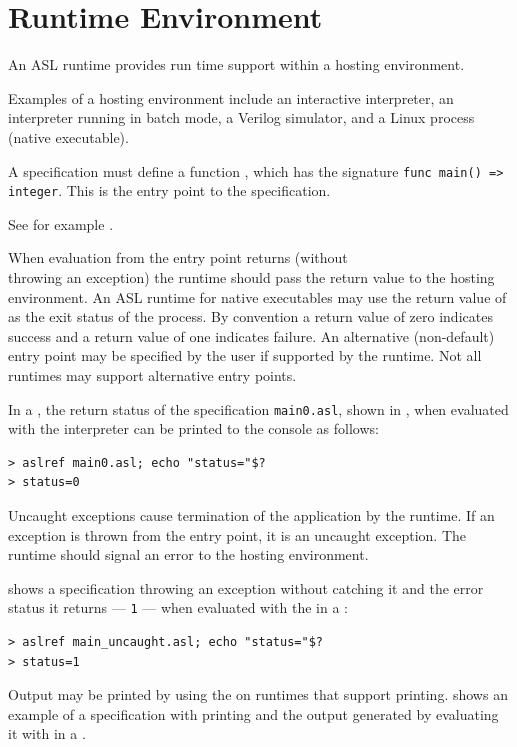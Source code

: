 \chapter{Runtime Environment\label{chap:RuntimeEnvironment}}

An ASL runtime provides run time support within a hosting environment.

Examples of a hosting environment include an interactive interpreter,
an interpreter running in batch mode,
a Verilog simulator, and a Linux process (native executable).

A specification must define a function \vmain{}, which has the signature
\verb|func main() => integer|.
This is the entry point to the specification.

See for example .

When evaluation from the entry point returns (without \\
throwing an exception)
the runtime should pass the return value to the hosting environment.
%
An ASL runtime for native executables may use the return value
of \vmain{} as the exit status of the process.
%
By convention a return value of zero indicates success and a return value of
one indicates failure.
%
An alternative (non-default) entry point may be specified by the user if
supported by the runtime. Not all runtimes may support alternative entry points.

In a \linuxbashshell{}, the return status of the specification \texttt{main0.asl},
shown in ,
when evaluated with the \aslref{}
interpreter can be printed to the console as follows:
\begin{Verbatim}[frame=single]
> aslref main0.asl; echo "status="$?
> status=0
\end{Verbatim}


Uncaught exceptions cause termination of the application by the runtime.
If an exception is thrown from the entry point, it is an uncaught exception.
The runtime should signal an error to the hosting environment.

 shows a specification throwing an exception
without catching it and the error status it returns --- \texttt{1} ---
when evaluated with the \aslref{} in a \linuxbashshell{}:
\begin{verbatim}
> aslref main_uncaught.asl; echo "status="$?
> status=1
\end{verbatim}


Output may be printed by using the \printstatementterm{} on
runtimes that support printing.
%
 shows an example of a specification
with printing and the output generated by evaluating it with \aslref{}
in a \linuxbashshell{}.
